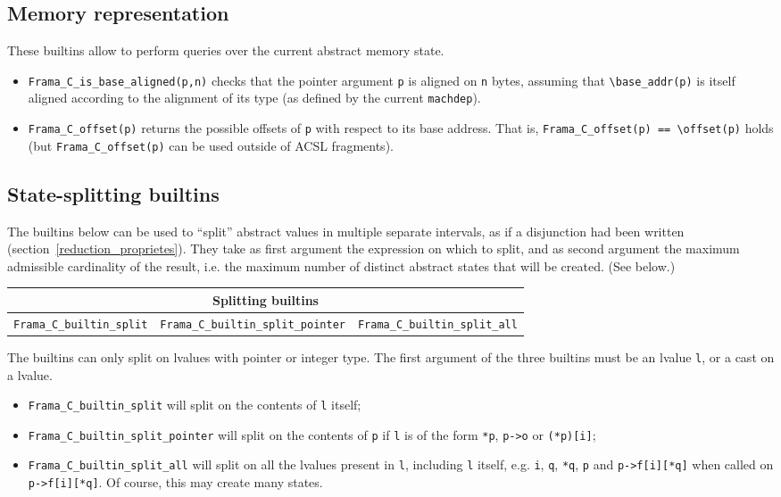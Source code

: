 \documentclass[web]{frama-c-book}
\begin{document}
\subsection{Memory representation}
These builtins allow to perform queries over the current abstract memory state.
\begin{itemize}
\item \lstinline|Frama_C_is_base_aligned(p,n)| checks that the pointer argument
  \lstinline|p| is aligned on \lstinline|n| bytes, assuming that
  \lstinline|\base_addr(p)| is itself aligned according to the alignment
  of its type (as defined by the current \lstinline+machdep+).
\item \lstinline|Frama_C_offset(p)| returns the possible offsets of
  \lstinline|p| with respect to its base address. That is,
  \lstinline|Frama_C_offset(p) == \offset(p)| holds (but
  \lstinline|Frama_C_offset(p)| can be used outside of ACSL fragments).
\end{itemize}

\subsection{State-splitting builtins}

The builtins below can be used to ``split'' abstract values in
multiple separate intervals, as if a disjunction had been written
(section~\ref{reduction_proprietes}). They take as
first argument the expression on which to split, and as second
argument the maximum admissible cardinality of the result, i.e. the
maximum number of distinct abstract states that will be created.
(See below.) 
\begin{table}[!ht]
  \centering
  \begin{tabular}{ccc}
    \multicolumn{3}{c}{Splitting builtins} \\
    \hline
    \lstinline|Frama_C_builtin_split| &
    \lstinline|Frama_C_builtin_split_pointer| &
    \lstinline|Frama_C_builtin_split_all| \\
  \end{tabular}
\end{table}

The builtins can only split on lvalues with pointer or integer type.
The first argument of the three builtins must be an lvalue
\lstinline+l+, or a cast on a lvalue.
\begin{itemize}
\item  \lstinline+Frama_C_builtin_split+ will split on the contents of
\lstinline+l+ itself;

\item  \lstinline+Frama_C_builtin_split_pointer+ will split on the contents of
\lstinline+p+ if \lstinline+l+ is of the form \lstinline+*p+, \lstinline+p->o+
or \lstinline+(*p)[i]+;

\item \lstinline+Frama_C_builtin_split_all+ will split on all the
  lvalues present in \lstinline+l+, including \lstinline+l+ itself,
  e.g.  \lstinline+i+, \lstinline+q+, \lstinline+*q+, \lstinline+p+
  and \lstinline+p->f[i][*q]+ when called on
  \lstinline+p->f[i][*q]+. Of course, this may create many states.

\end{itemize}
\end{document}
